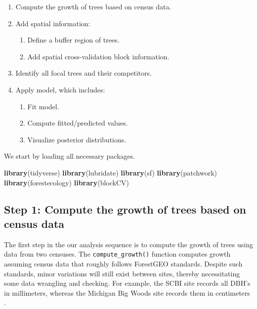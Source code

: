 \documentclass[12pt]{article}
\providecommand{\tightlist}{%
  \setlength{\itemsep}{0pt}\setlength{\parskip}{0pt}}
\newenvironment{Shaded}{\begin{snugshade}}{\end{snugshade}}
\newcommand{\KeywordTok}[1]{\textcolor[rgb]{0.13,0.29,0.53}{\textbf{#1}}}
\newcommand{\NormalTok}[1]{#1}
\begin{document}
\begin{enumerate}
\def\labelenumi{\arabic{enumi}.}
\tightlist
\item
  Compute the growth of trees based on census data.
\item
  Add spatial information:

  \begin{enumerate}
  \def\labelenumii{\arabic{enumii}.}
  \tightlist
  \item
    Define a buffer region of trees.
  \item
    Add spatial cross-validation block information.
  \end{enumerate}
\item
  Identify all focal trees and their competitors.
\item
  Apply model, which includes:

  \begin{enumerate}
  \def\labelenumii{\arabic{enumii}.}
  \tightlist
  \item
    Fit model.
  \item
    Compute fitted/predicted values.
  \item
    Visualize posterior distributions.
  \end{enumerate}
\end{enumerate}

We start by loading all necessary packages.

\begin{Shaded}
\begin{Highlighting}[]
\KeywordTok{library}\NormalTok{(tidyverse)}
\KeywordTok{library}\NormalTok{(lubridate)}
\KeywordTok{library}\NormalTok{(sf)}
\KeywordTok{library}\NormalTok{(patchwork)}
\KeywordTok{library}\NormalTok{(forestecology)}
\KeywordTok{library}\NormalTok{(blockCV)}
\end{Highlighting}
\end{Shaded}

\hypertarget{step-1-compute-the-growth-of-trees-based-on-census-data}{%
\subsection{Step 1: Compute the growth of trees based on census
data}\label{step-1-compute-the-growth-of-trees-based-on-census-data}}

The first step in the our analysis sequence is to compute the growth of
trees using data from two censuses. The \texttt{compute\_growth()}
function computes growth assuming census data that roughly follows
ForestGEO standards. Despite such standards, minor variations will still
exist between sites, thereby necessitating some data wrangling and
checking. For example, the SCBI site records all DBH's in millimeters,
whereas the Michigan Big Woods site records them in centimeters
\citet{andersonteixeira_ctfs-forestgeo_2015}
\citet{allen_michigan_2020}.
\end{document}
